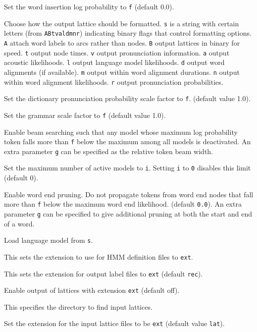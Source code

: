 \begin{optlist}
    Set the word insertion log probability to \texttt{f} 
        (default 0.0).

   Choose how the output lattice should be formatted.
         \texttt{s} is a string with certain letters (from \texttt{ABtvaldmnr})
         indicating binary flags that control formatting options.
         \texttt{A} attach word labels to arcs rather than nodes.
         \texttt{B} output lattices in binary for speed.
         \texttt{t} output node times.
         \texttt{v} output pronunciation information.
         \texttt{a} output acoustic likelihoods.
         \texttt{l} output language model likelihoods.
         \texttt{d} output word alignments (if available).
         \texttt{m} output within word alignment durations.
         \texttt{n} output within word alignment likelihoods.
         \texttt{r} output pronunciation probabilities.

   Set the dictionary pronunciation probability scale 
        factor to \texttt{f}. (default value 1.0).

   Set the grammar scale factor to \texttt{f} (default value 1.0).
 
   Enable beam searching such that any model whose 
        maximum log probability token falls more than
        \texttt{f} below the maximum among all models is deactivated. 
        An extra parameter \texttt{g} can be specified as the relative 
        token beam width.

   Set the maximum number of active models to \texttt{i}.
        Setting \texttt{i} to \texttt{0} disables this limit (default 0).

   Enable word end pruning. Do not propagate tokens from
        word end nodes that fall more than \texttt{f} below the maximum 
        word end likelihood.  (default \texttt{0.0}). 
        An extra parameter \texttt{g} can be specified to give
        additional pruning at both the start and end of a word.

   Load language model from \texttt{s}.

    This sets the extension to use for HMM definition
      files to \texttt{ext}.

    This sets the extension for output label files to
        \texttt{ext} (default \texttt{rec}).

    Enable output of lattices with extension \texttt{ext}
                   (default off).

   This specifies the directory to find input lattices. 


   Set the extension for the input lattice files 
        to be \texttt{ext}  (default value \texttt{lat}).

\stdoptF
\stdoptG
\stdoptH
\stdoptJ
\stdoptP

\end{optlist}

